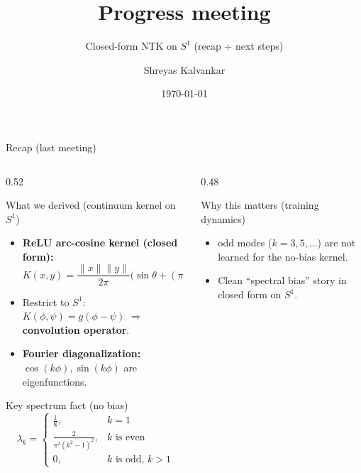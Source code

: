 \documentclass[10pt,aspectratio=169]{beamer}
\title{Progress meeting}
\subtitle{Closed-form NTK on $S^1$ (recap + next steps)}
\author{Shreyas Kalvankar}
\institute{TU Delft}
\date{\today}
\begin{document}
\maketitle

\begin{frame}{Recap (last meeting)}
	\small
	\begin{columns}[T,onlytextwidth]
		\begin{column}{0.52\textwidth}
			\begin{block}{What we derived (continuum kernel on $S^1$)}
				\begin{itemize}
					\item \textbf{ReLU arc-cosine kernel (closed form):}
					      \[
						      K(x,y)=\frac{\|x\|\|y\|}{2\pi}\Big(\sin\theta+(\pi-\theta)\cos\theta\Big).
					      \]
					\item Restrict to $S^1$: $K(\phi,\psi)=g(\phi-\psi)$ \;\;$\Rightarrow$ \;\;\textbf{convolution operator}.
					\item \textbf{Fourier diagonalization:} $\cos(k\phi),\sin(k\phi)$ are eigenfunctions.
				\end{itemize}
			\end{block}

			\begin{block}{Key spectrum fact (no bias)}
				\[
					\lambda_k =
					\begin{cases}
						\frac{1}{8},              & k = 1                    \\
						\frac{2}{\pi^2(k^2-1)^2}, & k \text{ is even}        \\
						0,                        & k \text{ is odd, } k > 1
					\end{cases}
				\]
			\end{block}
		\end{column}

		\begin{column}{0.48\textwidth}
			\begin{block}{Why this matters (training dynamics)}
				\begin{itemize}
					\item odd modes ($k=3,5,\dots$) are \alert{not learned} for the no-bias kernel.
					\item Clean “spectral bias” story in closed form on $S^1$.
				\end{itemize}
			\end{block}

		\end{column}
	\end{columns}

\end{frame}
\end{document}
